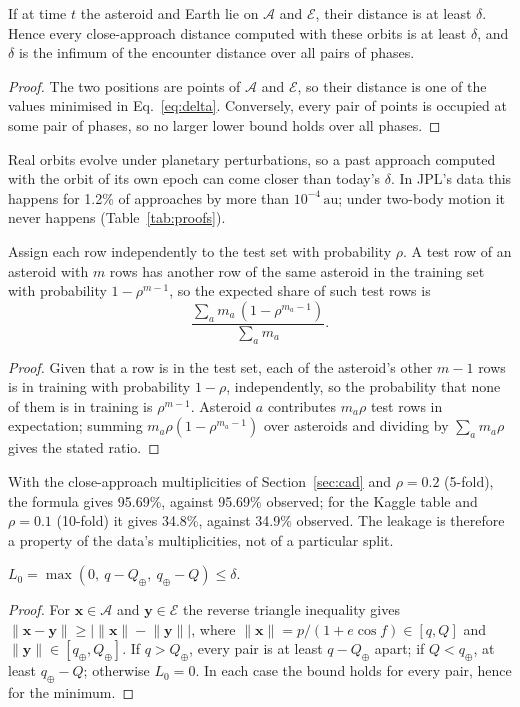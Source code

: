 \documentclass[make,article,submit,moreauthors]{Definitions/mdpi}
\newcommand{\au}{\,\mathrm{au}}
\begin{document}
\begin{Proposition}\label{prop:miss}
If at time $t$ the asteroid and Earth lie on $\mathcal{A}$ and $\mathcal{E}$, their distance is at least $\delta$. Hence every close-approach distance computed with these orbits is at least $\delta$, and $\delta$ is the infimum of the encounter distance over all pairs of phases.
\end{Proposition}
\begin{proof}
The two positions are points of $\mathcal{A}$ and $\mathcal{E}$, so their distance is one of the values minimised in Eq.~\eqref{eq:delta}. Conversely, every pair of points is occupied at some pair of phases, so no larger lower bound holds over all phases.
\end{proof}
Real orbits evolve under planetary perturbations, so a past approach computed with the orbit of its own epoch can come closer than today's $\delta$. In JPL's data this happens for 1.2\% of approaches by more than $10^{-4}\au$; under two-body motion it never happens (Table~\ref{tab:proofs}).

\begin{Proposition}\label{prop:leak}
Assign each row independently to the test set with probability $\rho$. A test row of an asteroid with $m$ rows has another row of the same asteroid in the training set with probability $1 - \rho^{m-1}$, so the expected share of such test rows is
\[
\frac{\sum_a m_a\,(1 - \rho^{m_a - 1})}{\sum_a m_a}.
\]
\end{Proposition}
\begin{proof}
Given that a row is in the test set, each of the asteroid's other $m - 1$ rows is in training with probability $1 - \rho$, independently, so the probability that none of them is in training is $\rho^{m-1}$. Asteroid $a$ contributes $m_a\rho$ test rows in expectation; summing $m_a\rho(1 - \rho^{m_a-1})$ over asteroids and dividing by $\sum_a m_a\rho$ gives the stated ratio.
\end{proof}
With the close-approach multiplicities of Section~\ref{sec:cad} and $\rho = 0.2$ (5-fold), the formula gives 95.69\%, against 95.69\% observed; for the Kaggle table and $\rho = 0.1$ (10-fold) it gives 34.8\%, against 34.9\% observed. The leakage is therefore a property of the data's multiplicities, not of a particular split.

\begin{Lemma}\label{lem:radial}
$L_0 = \max(0,\ q - Q_\oplus,\ q_\oplus - Q) \le \delta$.
\end{Lemma}
\begin{proof}
For $\mathbf{x}\in\mathcal{A}$ and $\mathbf{y}\in\mathcal{E}$ the reverse triangle inequality gives $\lVert\mathbf{x} - \mathbf{y}\rVert \ge \bigl|\lVert\mathbf{x}\rVert - \lVert\mathbf{y}\rVert\bigr|$, where $\lVert\mathbf{x}\rVert = p/(1 + e\cos f) \in [q, Q]$ and $\lVert\mathbf{y}\rVert \in [q_\oplus, Q_\oplus]$. If $q > Q_\oplus$, every pair is at least $q - Q_\oplus$ apart; if $Q < q_\oplus$, at least $q_\oplus - Q$; otherwise $L_0 = 0$. In each case the bound holds for every pair, hence for the minimum.
\end{proof}
\end{document}
